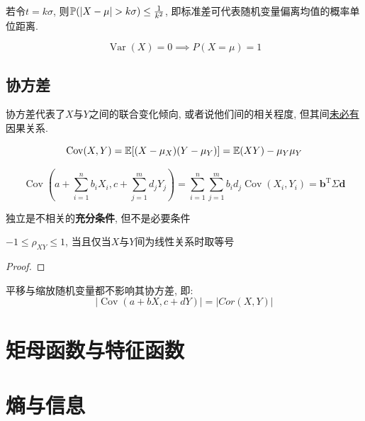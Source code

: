 \begin{remark}
    若令$t=k\sigma$, 则$\P(\left| X-\mu \right| >k\sigma)\le \frac{1}{k^{2}}$, 即标准差可代表随机变量偏离均值的概率单位距离.
\end{remark}

\begin{corollary}
    \[ \operatorname{Var}(X)=0 \implies P(X=\mu)=1 \]
\end{corollary}

\subsection{协方差}

协方差代表了$X$与$Y$之间的联合变化倾向, 或者说他们间的相关程度, 但其间\underline{未必有}因果关系. 

\begin{theorem}
    \[ \operatorname{Cov} (X,Y)=\E[(X-\mu_X)(Y-\mu_Y)]=\E(XY)-\mu_Y \mu_Y \]
\end{theorem}

\begin{theorem}
    \[ \operatorname{Cov}(a+\sum_{i=1}^n b_i X_i,c+\sum_{j=1}^m d_j Y_j) = \sum_{i=1}^n\sum_{j=1}^m b_i d_j \operatorname{Cov}(X_i,Y_i) = \mathbf{b}^{\mathrm{T}}\Sigma \mathbf{d}\]
\end{theorem}

\begin{theorem}
    独立是不相关的\textbf{充分条件}, 但不是必要条件
\end{theorem}

\begin{theorem}
    $-1\le \rho_{XY} \le 1$, 当且仅当$X$与$Y$间为线性关系时取等号
\end{theorem}

\begin{proof}
\end{proof}

\begin{theorem}
    平移与缩放随机变量都不影响其协方差, 即:
    \[ \left| \operatorname{Cov}(a+ b X,c +d Y) \right| = \left| Cor(X,Y) \right|  \]
\end{theorem}

\section{矩母函数与特征函数}



\section{熵与信息}

